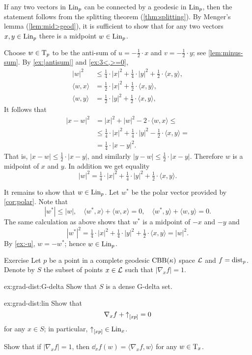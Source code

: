 If any two vectors in $\mathop{\rm Lin}\nolimits_p$ can be connected by a geodesic in $\mathop{\rm Lin}\nolimits_p$,
then the statement follows from the splitting theorem (\ref{thm:splitting}).
By Menger's lemma (\ref{lem:mid>geod}), it is sufficient to show that for any two vectors $x,y\in\mathop{\rm Lin}\nolimits_p$
there is a midpoint $w\in \mathop{\rm Lin}\nolimits_p$.

Choose $w\in \mathrm{T}_p$ to be the anti-sum of $u=-\tfrac{1}{2}\cdot x$ and $v=-\tfrac{1}{2}\cdot y$;
see \ref{lem:minus-sum}.
By \ref{ex:|antisum|} and \ref{ex:3<,>=0},
\begin{align*}
|w|^2&\le \tfrac14\cdot |x|^2+\tfrac14\cdot|y|^2+\tfrac12\cdot\langle x,y\rangle,
\\
\langle w,x\rangle&= \tfrac12\cdot|x|^2+\tfrac12\cdot\langle x,y\rangle,
\\
\langle w,y\rangle&= \tfrac12\cdot|y|^2+\tfrac12\cdot\langle x,y\rangle,
\end{align*}
It follows that 
\begin{align*}
|x-w|^2
&= |x|^2+|w|^2-2\cdot\langle w,x\rangle\le
\\
&\le \tfrac14\cdot |x|^2+\tfrac14\cdot|y|^2-\tfrac12\cdot\langle x,y\rangle=
\\
&=\tfrac14\cdot|x-y|^2.
\end{align*}
That is, $|x-w|\le \tfrac12\cdot|x-y|$, and similarly $|y-w|\le \tfrac12\cdot|x-y|$.
Therefore $w$ is a midpoint of $x$ and $y$.
In addition we get equality 
\[|w|^2= \tfrac14\cdot |x|^2+\tfrac14\cdot|y|^2+\tfrac12\cdot\langle x,y\rangle.\]

It remains to show that $w\in\mathop{\rm Lin}\nolimits_p$.
Let $w^*$ be the polar vector provided by \ref{cor:polar}.
Note that 
\[|w^*|\le |w|,
\quad
\langle w^*,x\rangle+\langle w,x\rangle=0,
\quad
\langle w^*,y\rangle+\langle w,y\rangle=0.
\]
The same calculation as above shows that $w^*$ is a midpoint of $-x$ and $-y$ and 
\[|w^*|^2= \tfrac14\cdot |x|^2+\tfrac14\cdot|y|^2+\tfrac12\cdot\langle x,y\rangle=|w|^2.\]
By \ref{ex:-u}, $w=-w^*$;
hence $w\in\mathop{\rm Lin}\nolimits_p$.
\qeds



\begin{thm}{Exercise}\label{ex:grad-dist}
Let $p$ be a point in a complete geodesic $\mathrm{CBB}(\kappa)$ space $\mathcal{L}$ and $f=\mathrm{dist}_p$.
Denote by $S$ the subset of points $x\in\mathcal{L}$ such that $|\nabla_xf|=1$.

\begin{subthm}{ex:grad-dist:G-delta}
Show that $S$ is a dense G-delta set.
\end{subthm}

\begin{subthm}{ex:grad-dist:lin}
Show that 
\[\nabla_xf+{\uparrow}_{[{x}{p}]}=0\]
for any 
$x\in S$;
in particular, ${\uparrow}_{[{x}{p}]}\in \mathop{\rm Lin}\nolimits_x$.
\end{subthm}

\begin{subthm}{}
Show that if $|\nabla_xf|=1$, then $\dd_xf(w)= \langle\nabla_xf,w\rangle$ for any $w\in \mathrm{T}_x$.
\end{subthm}


\end{thm}

